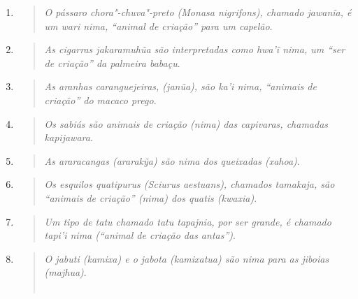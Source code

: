 \begin{enumerate}
\begin{quote}
  \emph{O pássaro surucuá"-de"-barriga"-vermelha (\emph{Trogon curucui}), chamado
    \emph{arakua}, é um \emph{tatu} \emph{nima}, isto é, um ``animal de
    criação dos tatus''}.
    \end{quote}
\item
\begin{quote}
  \emph{O pássaro chora"-chuva"-preto (\emph{Monasa} \emph{nigrifons}), chamado
    \emph{jawanĩa}, é um \emph{wari} \emph{nima}, ``animal de criação''
    para um capelão}.
    \end{quote}
\item
\begin{quote}
  \emph{As cigarras \emph{jakaramuhũa} são interpretadas como \emph{hwa'ĩ}
    \emph{nima}, um ``ser de criação'' da palmeira babaçu}.
    \end{quote}
\item
\begin{quote}
  \emph{As aranhas caranguejeiras, (\emph{janũa}), são \emph{ka'i}
    \emph{nima,} ``animais de criação'' do macaco prego}.
    \end{quote}
\item
  \begin{quote}
  \emph{Os sabiás são animais de criação (\emph{nima}) das capivaras, chamadas
    \emph{kapijawara}}.
  \end{quote}
\item
  \begin{quote}
  \emph{As araracangas (\emph{ararakỹa}) são \emph{nima} dos queixadas
    (\emph{xahoa})}.
  \end{quote}
\item
  \begin{quote}
  \emph{Os esquilos quatipurus (\emph{Sciurus aestuans}), chamados
    \emph{tamakaja}, são ``animais de criação'' (\emph{nima}) dos quatis
    (\emph{kwaxia})}.
  \end{quote}
\item
\begin{quote}
  \emph{Um tipo de tatu chamado \emph{tatu} \emph{tapajnia}, por ser grande, é
    chamado \emph{tapi'i} \emph{nima} (``animal de criação das antas'')}.
    \end{quote}
\item
  \begin{quote}
  \emph{O jabuti (\emph{kamixa}) e o jabota (\emph{kamixatua}) são \emph{nima}
    para as jiboias (\emph{majhua})}.\\
  ~\\

\end{quote}
\end{enumerate}
